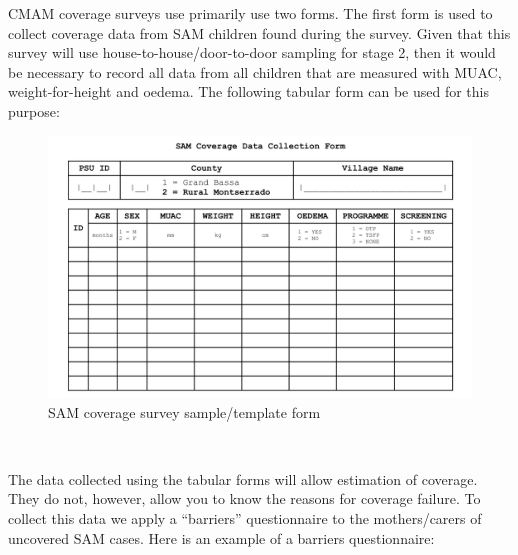 \documentclass[12pt,a4paper]{book}
\theoremstyle{definition}
\theoremstyle{definition}
\theoremstyle{definition}
\theoremstyle{remark}
\begin{document}
CMAM coverage surveys use primarily use two forms. The first form is
used to collect coverage data from SAM children found during the survey.
Given that this survey will use house-to-house/door-to-door sampling for
stage 2, then it would be necessary to record all data from all children
that are measured with MUAC, weight-for-height and oedema. The following
tabular form can be used for this purpose:

\newpage

\begin{figure}[H]

{\centering \includegraphics[width=0.9\linewidth]{forms/samForm} 

}

\caption{SAM coverage survey sample/template form}\label{fig:samform}
\end{figure}

~

The data collected using the tabular forms will allow estimation of
coverage. They do not, however, allow you to know the reasons for
coverage failure. To collect this data we apply a ``barriers''
questionnaire to the mothers/carers of uncovered SAM cases. Here is an
example of a barriers questionnaire:

\newpage
\end{document}
